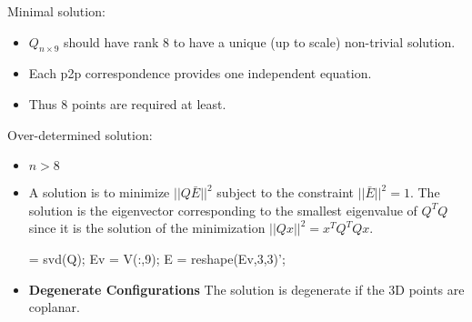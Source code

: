 \documentclass[10pt,a4paper]{scrartcl}
\begin{document}
\begin{multicols*}{2}


Minimal solution:

\begin{itemize}
\item $Q_{n\times 9}$ should have rank 8 to have a unique (up to scale) non-trivial solution.
\item Each p2p correspondence provides one independent equation.
\item Thus 8 points are required at least.
\end{itemize}

Over-determined solution:

\begin{itemize}
\item $n>8$
\item A solution is to minimize $||Q\bar{E}||^2$ subject to the constraint $||\bar{E}||^2=1$. The solution is the eigenvector corresponding to the smallest eigenvalue of $Q^TQ$ since it is the solution of the minimization $||Qx||^2=x^TQ^TQx$.

\begin{TPMatlab}
[U,S,V] = svd(Q);
Ev = V(:,9);
E = reshape(Ev,3,3)';
\end{TPMatlab}
\item \textbf{Degenerate Configurations} The solution is degenerate if the 3D points are coplanar.
\end{itemize}


\end{multicols*}
\end{document}
